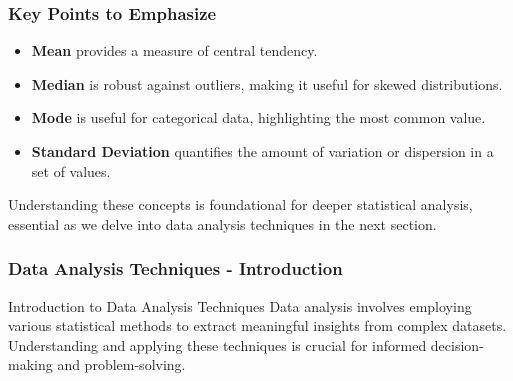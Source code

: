 \documentclass[aspectratio=169]{beamer}
\begin{document}
\begin{frame}[fragile]
    \frametitle{Key Points to Emphasize}
    \begin{itemize}
        \item \textbf{Mean} provides a measure of central tendency.
        \item \textbf{Median} is robust against outliers, making it useful for skewed distributions.
        \item \textbf{Mode} is useful for categorical data, highlighting the most common value.
        \item \textbf{Standard Deviation} quantifies the amount of variation or dispersion in a set of values.
    \end{itemize}
    
    Understanding these concepts is foundational for deeper statistical analysis, essential as we delve into data analysis techniques in the next section.
\end{frame}

\begin{frame}[fragile]
    \frametitle{Data Analysis Techniques - Introduction}
    \begin{block}{Introduction to Data Analysis Techniques}
        Data analysis involves employing various statistical methods to extract meaningful insights from complex datasets. 
        Understanding and applying these techniques is crucial for informed decision-making and problem-solving.
    \end{block}
\end{frame}
\end{document}
